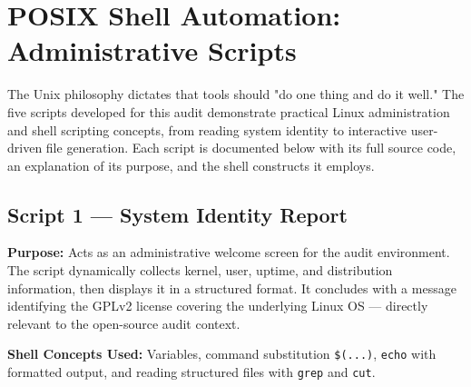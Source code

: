 \section{POSIX Shell Automation: Administrative Scripts}

The Unix philosophy dictates that tools should "do one thing and do it well." The five scripts
developed for this audit demonstrate practical Linux administration and shell scripting concepts,
from reading system identity to interactive user-driven file generation. Each script is
documented below with its full source code, an explanation of its purpose, and the shell
constructs it employs.

\subsection{Script 1 — System Identity Report}

\textbf{Purpose:} Acts as an administrative welcome screen for the audit environment. The script
dynamically collects kernel, user, uptime, and distribution information, then displays it in a
structured format. It concludes with a message identifying the GPLv2 license covering the
underlying Linux OS — directly relevant to the open-source audit context.

\textbf{Shell Concepts Used:} Variables, command substitution \texttt{\$(...)}, \texttt{echo}
with formatted output, and reading structured files with \texttt{grep} and \texttt{cut}.


